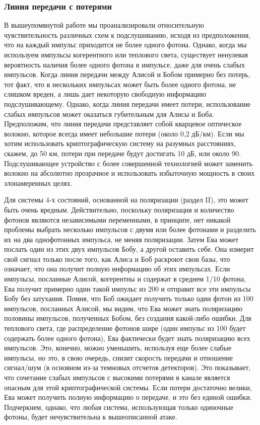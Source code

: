 \subsubsection{Линия передачи с потерями}

В вышеупомянутой работе мы проанализировали относительную чувствительность различных схем к подслушиванию, исходя из предположения, что на каждый импульс приходится не более одного фотона. Однако, когда мы используем импульсы когерентного или теплового света, существует ненулевая вероятность наличия более одного фотона в импульсе, даже для очень слабых импульсов. Когда линия передачи между Алисой и Бобом примерно без потерь, тот факт, что в нескольких импульсах может быть более одного фотона, не слишком вреден, а лишь дает некоторую свободную информацию подслушивающему. Однако, когда линия передачи имеет потери, использование слабых импульсов может оказаться губительным для Алисы и Боба. Предположим, что линия передачи представляет собой кварцевое оптическое волокно, которое всегда имеет небольшие потери (около 0,2 дБ/км). Если мы хотим использовать криптографическую систему на разумных расстояниях, скажем, до 50 км, потери при передаче будут достигать 10 дБ, или около 90. Подслушивающее устройство с более совершенной технологией может заменить волокно на абсолютно прозрачное и использовать избыточную мощность в своих злонамеренных целях.

Для системы 4-х состояний, основанной на поляризации (раздел II), это может быть очень вредным. Действительно, поскольку поляризация и количество фотонов являются независимыми переменными, в принципе, нет никакой проблемы выбрать несколько импульсов с двумя или более фотонами и разделить их на два однофотонных импульса, не меняя поляризации. Затем Ева может послать один из этих двух импульсов Бобу, а другой оставить себе. Она измерит свой сигнал только после того, как Алиса и Боб раскроют свои базы, что означает, что она получит полную информацию об этих импульсах. Если импульсы, посланные Алисой, когерентны и содержат в среднем 1/10 фотона, Ева получит примерно один такой импульс из 200 и отправит все эти импульсы Бобу без затухания. Помня, что Боб ожидает получить только один фотон из 100 импульсов, посланных Алисой, мы видим, что Ева может знать поляризацию половины импульсов, полученных Бобом, без создания какой-либо ошибки. Для теплового света, где распределение фотонов шире (один импульс из 100 будет содержать более одного фотона), Ева фактически будет знать поляризацию всех импульсов. Это, конечно, можно уменьшить, используя еще более слабые импульсы, но это, в свою очередь, снизит скорость передачи и отношение сигнал/шум (в основном из-за темновых отсчетов детекторов). Это показывает, что сочетание слабых импульсов с высокими потерями в канале является опасным для этой криптографической системы. Если потери достаточно велики, Ева может получить полную информацию о передаче, и это без единой ошибки. Подчеркнем, однако, что любая система, использующая только одиночные фотоны, будет нечувствительна к вышеописанной атаке.

